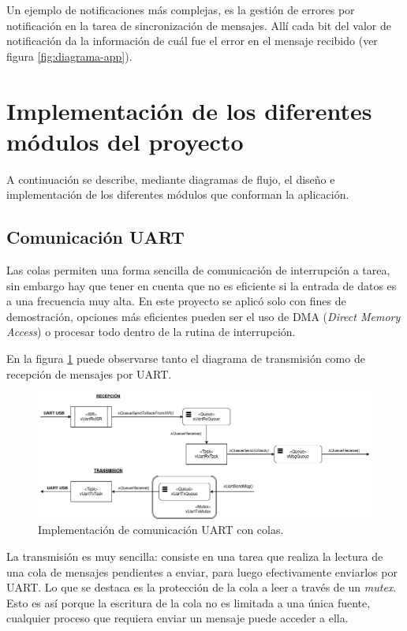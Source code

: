 \documentclass{IEEEtran}
\begin{document}
Un ejemplo de notificaciones más complejas, es la gestión de errores por notificación en la tarea de sincronización de mensajes. Allí cada bit del valor de notificación da la información de cuál fue el error en el mensaje recibido (ver figura \ref{fig:diagrama-app}).

\section{Implementación de los diferentes módulos del proyecto}
\label{sec:modulos}

A continuación se describe, mediante diagramas de flujo, el diseño e implementación de los diferentes módulos que conforman la aplicación.

\subsection{Comunicación UART}
\label{sec:uart}
Las colas permiten una forma sencilla de comunicación de interrupción a tarea, sin embargo hay que tener en cuenta que no es eficiente si la entrada de datos es a una frecuencia muy alta. En este proyecto se aplicó solo con fines de demostración, opciones más eficientes pueden ser el uso de DMA (\textit{Direct Memory Access}) o procesar todo dentro de la rutina de interrupción.

En la figura \ref{fig:diagrama-uart} puede observarse tanto el diagrama de transmisión como de recepción de mensajes por UART.

\begin{figure}[ht]
    \centering
    \includegraphics[scale=0.5]{../diagrama_uart.png}
    \caption{Implementación de comunicación UART con colas.}
    \label{fig:diagrama-uart}
\end{figure}

La transmisión es muy sencilla: consiste en una tarea que realiza la lectura de una cola de mensajes pendientes a enviar, para luego efectivamente enviarlos por UART. Lo que se destaca es la protección de la cola a leer a través de un \textit{mutex}. Esto es así porque la escritura de la cola no es limitada a una única fuente, cualquier proceso que requiera enviar un mensaje puede acceder a ella.
\end{document}
